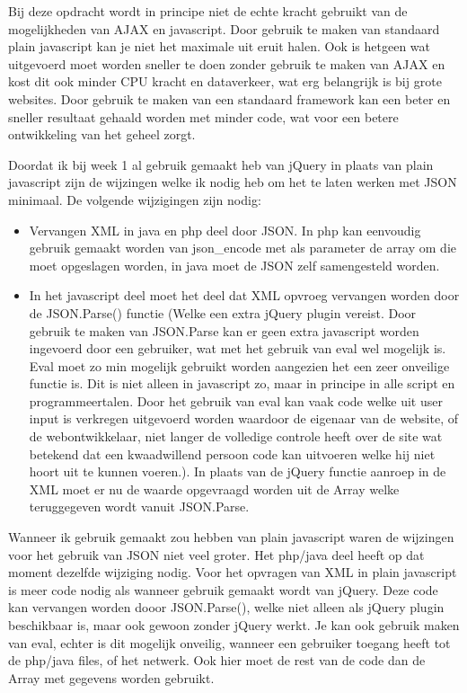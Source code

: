 Bij deze opdracht wordt in principe niet de echte kracht gebruikt van de mogelijkheden van AJAX en javascript. Door gebruik te maken van standaard plain javascript kan je niet het maximale uit eruit halen. Ook is hetgeen wat uitgevoerd moet worden sneller te doen zonder gebruik te maken van AJAX en kost dit ook minder CPU kracht en dataverkeer, wat erg belangrijk is bij grote websites. Door gebruik te maken van een standaard framework kan een beter en sneller resultaat gehaald worden met minder code, wat voor een betere ontwikkeling van het geheel zorgt. 

Doordat ik bij week 1 al gebruik gemaakt heb van jQuery in plaats van plain javascript zijn de wijzingen welke ik nodig heb om het te laten werken met JSON minimaal. De volgende wijzigingen zijn nodig:
\begin{itemize}
        \item Vervangen XML in java en php deel door JSON. In php kan eenvoudig gebruik gemaakt worden van json\_encode met als parameter de array om die moet opgeslagen worden, in java moet de JSON zelf samengesteld worden.
        \item In het javascript deel moet het deel dat XML opvroeg vervangen worden door de JSON.Parse() functie (Welke een extra jQuery plugin vereist. Door gebruik te maken van JSON.Parse kan er geen extra javascript worden ingevoerd door een gebruiker, wat met het gebruik van eval wel mogelijk is. Eval moet zo min mogelijk gebruikt worden aangezien het een zeer onveilige functie is. Dit is niet alleen in javascript zo, maar in principe in alle script en programmeertalen. Door het gebruik van eval kan vaak code welke uit user input is verkregen uitgevoerd worden waardoor de eigenaar van de website, of de webontwikkelaar, niet langer de volledige controle heeft over de site wat betekend dat een kwaadwillend persoon code kan uitvoeren welke hij niet hoort uit te kunnen voeren.). In plaats van de jQuery functie aanroep in de XML moet er nu de waarde opgevraagd worden uit de Array welke teruggegeven wordt vanuit JSON.Parse.
\end{itemize}
Wanneer ik gebruik gemaakt zou hebben van plain javascript waren de wijzingen voor het gebruik van JSON niet veel groter. Het php/java deel heeft op dat moment dezelfde wijziging nodig. Voor het opvragen van XML in plain javascript is meer code nodig als wanneer gebruik gemaakt wordt van jQuery. Deze code kan vervangen worden dooor JSON.Parse(), welke niet alleen als jQuery plugin beschikbaar is, maar ook gewoon zonder jQuery werkt. Je kan ook gebruik maken van eval, echter is dit mogelijk onveilig, wanneer een gebruiker toegang heeft tot de php/java files, of het netwerk. Ook hier moet de rest van de code dan de Array met gegevens worden gebruikt.

